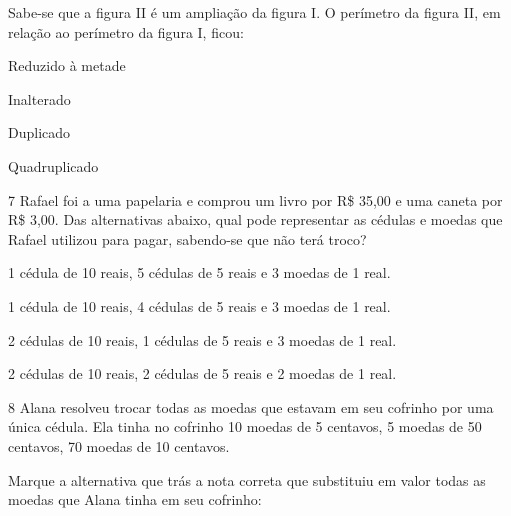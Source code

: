 Sabe-se que a figura II é um ampliação da figura I. O perímetro da
figura II, em relação ao perímetro da figura I, ficou:

\begin{minipage}{.5\textwidth}
\begin{escolha}
\item
  Reduzido à metade
\item
  Inalterado
\item
  Duplicado
\item
  Quadruplicado
\end{escolha}
\end{minipage}

\num{7} Rafael foi a uma papelaria e comprou um livro por R\$ 35,00 e uma
caneta por R\$ 3,00. Das alternativas abaixo, qual pode representar as
cédulas e moedas que Rafael utilizou para pagar, sabendo-se que não terá
troco?

\begin{escolha}
\item
  1 cédula de 10 reais, 5 cédulas de 5 reais e 3 moedas de 1 real.
\item
  1 cédula de 10 reais, 4 cédulas de 5 reais e 3 moedas de 1 real.
\item
  2 cédulas de 10 reais, 1 cédulas de 5 reais e 3 moedas de 1 real.
\item
  2 cédulas de 10 reais, 2 cédulas de 5 reais e 2 moedas de 1 real.
\end{escolha}


\num{8} Alana resolveu trocar todas as moedas que estavam em seu cofrinho
por uma única cédula. Ela tinha no cofrinho 10 moedas de 5 centavos, 5
moedas de 50 centavos, 70 moedas de 10 centavos.

Marque a alternativa que trás a nota correta que substituiu em valor
todas as moedas que Alana tinha em seu cofrinho:


